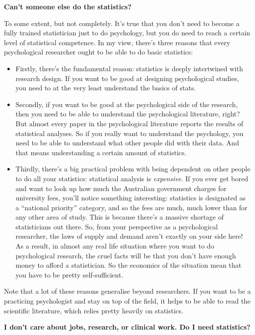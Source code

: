 \documentclass[
]{book}
\providecommand{\tightlist}{%
  \setlength{\itemsep}{0pt}\setlength{\parskip}{0pt}}
\begin{document}
\textbf{Can't someone else do the statistics?}

To some extent, but not completely. It's true that you don't need to become a fully trained statistician just to do psychology, but you do need to reach a certain level of statistical competence. In my view, there's three reasons that every psychological researcher ought to be able to do basic statistics:

\begin{itemize}
\tightlist
\item
  Firstly, there's the fundamental reason: statistics is deeply intertwined with research design. If you want to be good at designing psychological studies, you need to at the very least understand the basics of stats.
\item
  Secondly, if you want to be good at the psychological side of the research, then you need to be able to understand the psychological literature, right? But almost every paper in the psychological literature reports the results of statistical analyses. So if you really want to understand the psychology, you need to be able to understand what other people did with their data. And that means understanding a certain amount of statistics.
\item
  Thirdly, there's a big practical problem with being dependent on other people to do all your statistics: statistical analysis is \emph{expensive}. If you ever get bored and want to look up how much the Australian government charges for university fees, you'll notice something interesting: statistics is designated as a ``national priority'' category, and so the fees are much, much lower than for any other area of study. This is because there's a massive shortage of statisticians out there. So, from your perspective as a psychological researcher, the laws of supply and demand aren't exactly on your side here! As a result, in almost any real life situation where you want to do psychological research, the cruel facts will be that you don't have enough money to afford a statistician. So the economics of the situation mean that you have to be pretty self-sufficient.
\end{itemize}

Note that a lot of these reasons generalise beyond researchers. If you want to be a practicing psychologist and stay on top of the field, it helps to be able to read the scientific literature, which relies pretty heavily on statistics.

\textbf{I don't care about jobs, research, or clinical work. Do I need statistics?}
\end{document}
